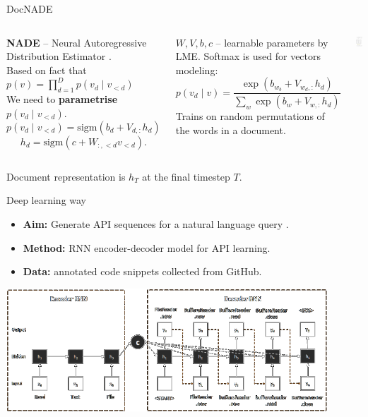 \documentclass[10pt,aspectratio=1610]{beamer}
\begin{document}
\begin{frame}{DocNADE}
  \begin{columns}[T,onlytextwidth]
      \textbf{NADE} -- Neural Autoregressive Distribution Estimator \cite{larochelle2011neural}.\\[2mm]

      Based on fact that \qquad
      $ \displaystyle
        p(v) = 
          \prod_{d=1}^D p(v_d \mid v_{<d})
      $ \\[3mm]
      We need to \textbf{parametrise} $p(v_d \mid v_{<d})$.\\[-3.5mm]
      \pause
      $$
        p(v_d \mid v_{<d}) = \mathrm{sigm}(b_d + V_{d,:}h_d)
      $$
      $$
        h_d = \mathrm{sigm}(c + W_{:, <d}v_{<d}).
      $$

      $W, V, b, c$ -- learnable parameters by LME.
      \pause
      Softmax is used for vectors modeling:
      $$
        p(v_d \mid v) = \dfrac{\exp(b_{w_b} + V_{w_d, :}h_d)}{\sum_w\exp(b_{w} + V_{w, :}h_d)}
      $$
      \pause
      Trains on random permutations of the words in a document.

      \vspace{7mm}
      \quad\includegraphics[width=4.2cm]{./imgs/nade.png}
  \end{columns}
  Document representation is $h_T$ at the final timestep $T$.
\end{frame}

\begin{frame}{Deep learning way}
  \begin{itemize}
    \item  \textbf{Aim:} Generate API sequences for a natural language query \cite{gu2016deepAPILearning}.
    \item  \textbf{Method:} RNN encoder-decoder model for API learning.
    \item  \textbf{Data:} annotated code snippets collected from GitHub.
  \end{itemize}
  \centering\includegraphics[width=12cm]{./imgs/rnn-encoder-decoder.png}
\end{frame}
\end{document}
